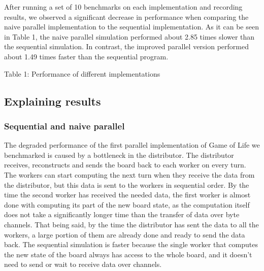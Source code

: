 \documentclass[a4, 11pt]{article}
\begin{document}
\begin{multicols}{2}
After running a set of 10 benchmarks on each implementation and recording results, we observed a significant decrease in performance when comparing the naive parallel implementation to the sequential implementation. As it can be seen in Table 1, the naive parallel simulation performed about 2.85 times slower than the sequential simulation. In contrast, the improved parallel version performed about 1.49 times faster than the sequential program.

\vspace{0.5cm}

\begin{center}Table 1: Performance of different implementations\end{center} 
\vspace{0.2cm}
\vspace{0.4cm}

\subsection{Explaining results}
\subsubsection{Sequential and naive parallel}
The degraded performance of the first parallel implementation of Game of Life we benchmarked is caused by a bottleneck in the distributor. The distributor receives, reconstructs and sends the board back to each worker on every turn. The workers can start computing the next turn when they receive the data from the distributor, but this data is sent to the workers in sequential order. By the time the second worker has received the needed data, the first worker is almost done with computing its part of the new board state, as the computation itself does not take a significantly longer time than the transfer of data over byte channels. That being said, by the time the distributor has sent the data to all the workers, a large portion of them are already done and ready to send the data back. The sequential simulation is faster because the single worker that computes the new state of the board always has access to the whole board, and it doesn't need to send or wait to receive data over channels.


\end{multicols}
\end{document}
